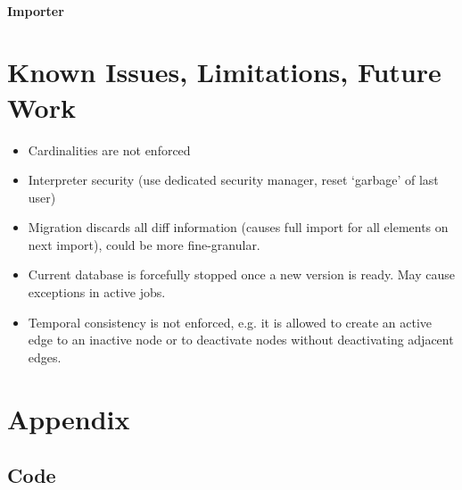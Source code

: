 \subsubsection{Importer}
\chapter{Known Issues, Limitations, Future Work}
\begin{itemize}
\item Cardinalities are not enforced
\item Interpreter security (use dedicated security manager, reset `garbage' of last user)
\item Migration discards all diff information (causes full import for all elements on next import), could be more fine-granular.
\item Current database is forcefully stopped once a new version is ready. May cause exceptions in active jobs.
\item Temporal consistency is not enforced, e.g. it is allowed to create an active edge to an inactive node or to deactivate nodes without deactivating adjacent edges. 
\end{itemize}

\backmatter
\chapter{Appendix}
\section {Code}


\printglossary[style=altlist]
\listoftables
\listoffigures
\lstlistoflistings
%


